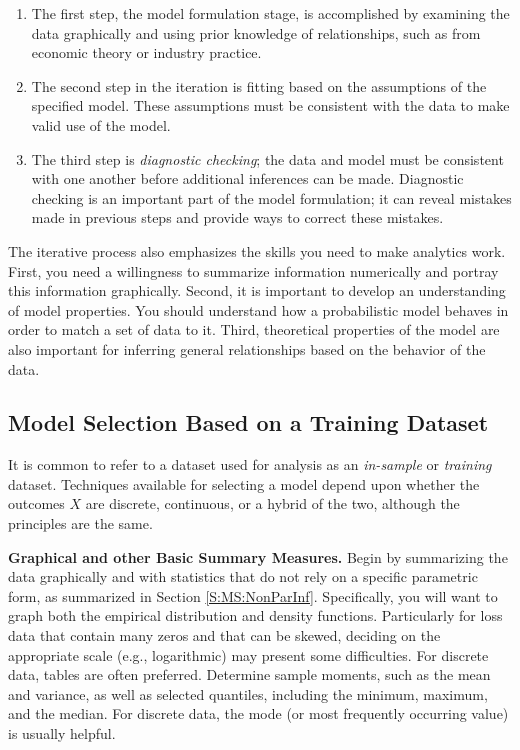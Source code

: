 \documentclass[]{book}
\providecommand{\tightlist}{%
  \setlength{\itemsep}{0pt}\setlength{\parskip}{0pt}}
\theoremstyle{definition}
\theoremstyle{definition}
\theoremstyle{definition}
\theoremstyle{remark}
\begin{document}
\begin{enumerate}
\def\labelenumi{\arabic{enumi}.}
\tightlist
\item
  The first step, the model formulation stage, is accomplished by
  examining the data graphically and using prior knowledge of
  relationships, such as from economic theory or industry practice.
\item
  The second step in the iteration is fitting based on the assumptions
  of the specified model. These assumptions must be consistent with the
  data to make valid use of the model.
\item
  The third step is \emph{diagnostic checking}; the data and model must
  be consistent with one another before additional inferences can be
  made. Diagnostic checking is an important part of the model
  formulation; it can reveal mistakes made in previous steps and provide
  ways to correct these mistakes.
\end{enumerate}

The iterative process also emphasizes the skills you need to make
analytics work. First, you need a willingness to summarize information
numerically and portray this information graphically. Second, it is
important to develop an understanding of model properties. You should
understand how a probabilistic model behaves in order to match a set of
data to it. Third, theoretical properties of the model are also
important for inferring general relationships based on the behavior of
the data.

\subsection{Model Selection Based on a Training
Dataset}\label{model-selection-based-on-a-training-dataset}

It is common to refer to a dataset used for analysis as an
\emph{in-sample} or \emph{training} dataset. Techniques available for
selecting a model depend upon whether the outcomes \(X\) are discrete,
continuous, or a hybrid of the two, although the principles are the
same.

\textbf{Graphical and other Basic Summary Measures.} Begin by
summarizing the data graphically and with statistics that do not rely on
a specific parametric form, as summarized in Section
\ref{S:MS:NonParInf}. Specifically, you will want to graph both the
empirical distribution and density functions. Particularly for loss data
that contain many zeros and that can be skewed, deciding on the
appropriate scale (e.g., logarithmic) may present some difficulties. For
discrete data, tables are often preferred. Determine sample moments,
such as the mean and variance, as well as selected quantiles, including
the minimum, maximum, and the median. For discrete data, the mode (or
most frequently occurring value) is usually helpful.
\end{document}
